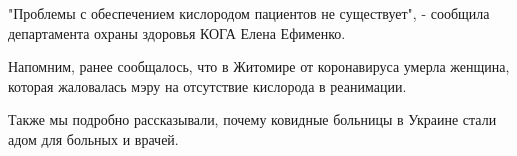 "Проблемы с обеспечением кислородом пациентов не существует", - сообщила
департамента охраны здоровья КОГА Елена Ефименко.

Напомним, ранее сообщалось, что в Житомире от коронавируса умерла женщина,
которая жаловалась мэру на отсутствие кислорода в реанимации.

Также мы подробно рассказывали, почему ковидные больницы в Украине стали
адом для больных и врачей.



